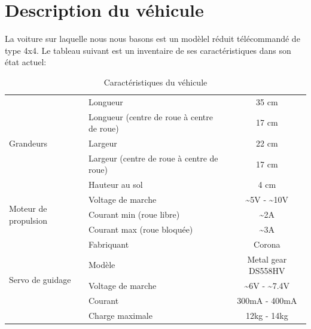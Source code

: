 \documentclass[a4paper,12pt]{article}
\begin{document}
{\section{Description du véhicule \label{TableDesc}}
La voiture sur laquelle nous nous basons est un modèlel r\'eduit
t\'el\'ecommand\'e de type 4x4. Le tableau suivant est un inventaire de 
ses caractéristiques dans son \'etat actuel:
\begin{table}[h!]
\begin{center}
  \begin{tabular}{|p{4cm}|p{4cm}|c|}
    \hline
    \multirow{5}{*}{Grandeurs}
    &Longueur & 35 cm \\ \cline{2-3}
    &Longueur (centre de roue \`a centre de roue)& 17 cm \\ \cline{2-3}
    &Largeur & 22 cm \\ \cline{2-3}
    &Largeur (centre de roue \`a centre de roue) & 17 cm \\ \cline{2-3}
    & Hauteur au sol & 4 cm\\ \hline
    \multirow{3}{*}{Moteur de propulsion}
    & Voltage de marche & \~{}5V - \~{}10V  \\ \cline{2-3}
    & Courant min (roue libre) & \~{}2A \\ \cline{2-3}
    & Courant max (roue bloqu\'ee) & \~{}3A \\ \hline
    \multirow{5}{*}{Servo de guidage}
    & Fabriquant & Corona \\ \cline{2 - 3}
    & Modèle & Metal gear DS558HV\\ \cline{2-3}
    & Voltage de marche & \~{}6V - \~{}7.4V  \\ \cline{2-3}
    & Courant & 300mA - 400mA \\ \cline{2-3}
    & Charge maximale & 12kg - 14kg \\  
 \hline
	\end{tabular}
\end{center}
\caption{Caractéristiques du véhicule}
\end{table}
}
\end{document}
